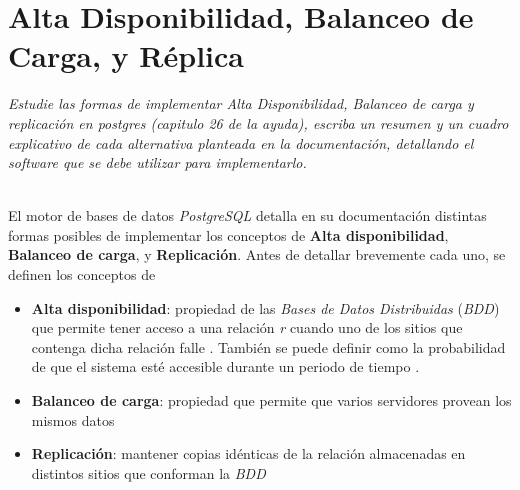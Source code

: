 







\clearpage
\tableofcontents
\clearpage 



\section{Alta Disponibilidad, Balanceo de Carga, y Réplica}
\emph{Estudie las formas de implementar Alta Disponibilidad, Balanceo de carga y replicación en postgres (capitulo 26 de la ayuda), escriba un resumen y un cuadro explicativo de cada alternativa planteada en la documentación, detallando el software que se debe utilizar para implementarlo.} 

~\\

El motor de bases de datos \emph{PostgreSQL} detalla en su documentación distintas formas posibles de implementar los conceptos de \textbf{Alta disponibilidad}, \textbf{Balanceo de carga}, y \textbf{Replicación}. Antes de detallar brevemente cada uno, se definen los conceptos de
\begin{itemize}
    \item \textbf{Alta disponibilidad}: propiedad de las \emph{Bases de Datos Distribuidas} (\emph{BDD}) que permite tener acceso a una relación \emph{r} cuando uno de los sitios que contenga dicha relación falle \autocite{silberschatz}. También se puede definir como la probabilidad de que el sistema esté accesible durante un periodo de tiempo \autocite{elmasri}.
    \item \textbf{Balanceo de carga}: propiedad que permite que varios servidores provean los mismos datos \autocite{high-availability}
    \item \textbf{Replicación}: mantener copias idénticas de la relación almacenadas en distintos sitios que conforman la \emph{BDD} \autocite{silberschatz} 
\end{itemize}

